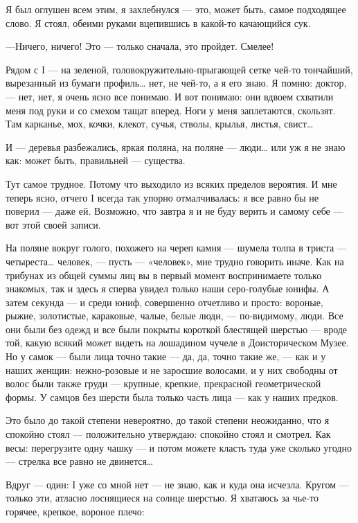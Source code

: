 \documentclass[11pt,openany]{book}
\begin{document}
Я был оглушен всем этим, я захлебнулся --- это, может быть, самое подходящее слово. Я стоял, обеими руками вцепившись в какой-то качающийся сук.

---Ничего, ничего! Это --- только сначала, это пройдет. Смелее!

Рядом с I --- на зеленой, головокружительно-прыгающей сетке чей-то тончайший, вырезанный из бумаги профиль\ldots{} нет, не чей-то, а я его знаю. Я помню: доктор, --- нет, нет, я очень ясно все понимаю. И вот понимаю: они вдвоем схватили меня под руки и со смехом тащат вперед. Ноги у меня заплетаются, скользят. Там карканье, мох, кочки, клекот, сучья, стволы, крылья, листья, свист\ldots{}

И --- деревья разбежались, яркая поляна, на поляне --- люди\ldots{} или уж я не знаю как: может быть, правильней --- существа.

Тут самое трудное. Потому что  выходило из всяких пределов вероятия. И мне теперь ясно, отчего I всегда так упорно отмалчивалась: я все равно бы не поверил --- даже ей. Возможно, что завтра я и не буду верить и самому себе --- вот этой своей записи.

На поляне вокруг голого, похожего на череп камня --- шумела толпа в триста --- четыреста\ldots{} человек, --- пусть --- «человек», мне трудно говорить иначе. Как на трибунах из общей суммы лиц вы в первый момент воспринимаете только знакомых, так и здесь я сперва увидел только наши серо-голубые юнифы. А затем секунда --- и среди юниф, совершенно отчетливо и просто: вороные, рыжие, золотистые, караковые, чалые, белые люди, --- по-видимому, люди. Все они были без одежд и все были покрыты короткой блестящей шерстью --- вроде той, какую всякий может видеть на лошадином чучеле в Доисторическом Музее. Но у самок --- были лица точно такие --- да, да, точно такие же, --- как и у наших женщин: нежно-розовые и не заросшие волосами, и у них свободны от волос были также груди --- крупные, крепкие, прекрасной геометрической формы. У самцов без шерсти была только часть лица --- как у наших предков.

Это было до такой степени невероятно, до такой степени неожиданно, что я спокойно стоял --- положительно утверждаю: спокойно стоял и смотрел. Как весы: перегрузите одну чашку --- и потом можете класть туда уже сколько угодно --- стрелка все равно не двинется\ldots{}

Вдруг --- один: I уже со мной нет --- не знаю, как и куда она исчезла. Кругом --- только эти, атласно лоснящиеся на солнце шерстью. Я хватаюсь за чье-то горячее, крепкое, вороное плечо:
\end{document}
